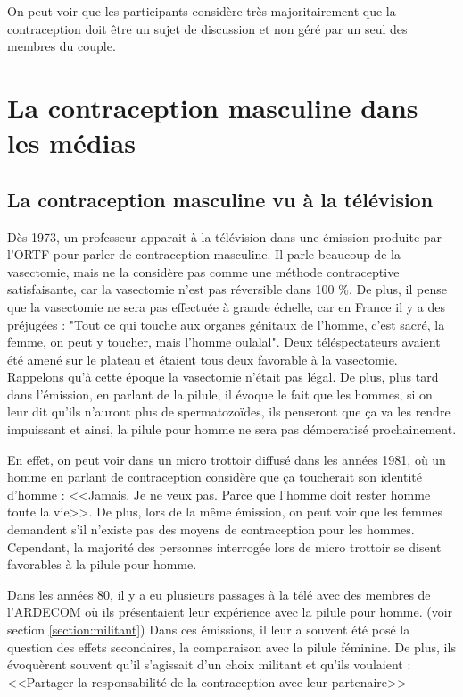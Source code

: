 \documentclass[12pt,a4paper]{report}
\begin{document}
On peut voir que les participants considère très majoritairement que la contraception doit être un sujet de discussion et non géré par un seul des membres du couple.

\section{La contraception masculine dans les médias}

\subsection{La contraception masculine vu à la télévision}

Dès 1973, un professeur apparait à la télévision dans une émission produite par l'ORTF pour parler de contraception masculine. Il parle beaucoup de la vasectomie, mais ne la considère pas comme une méthode contraceptive satisfaisante, car la vasectomie n'est pas réversible dans 100 \%. De plus, il pense que la vasectomie ne sera pas effectuée à grande échelle, car en France il y a des préjugées : "Tout ce qui touche aux organes génitaux de l'homme, c'est sacré, la femme, on peut y toucher, mais l'homme oulalal". Deux téléspectateurs avaient été amené sur le plateau et étaient tous deux favorable à la vasectomie. \cite{ProfesseurNetterContraception} Rappelons qu'à cette époque la vasectomie n'était pas légal. \cite{guillaumedaudinContraceptesEnqueteDernier2022} De plus, plus tard dans l'émission, en parlant de la pilule, il évoque le fait que les hommes, si on leur dit qu'ils n'auront plus de spermatozoïdes, ils penseront que ça va les rendre impuissant et ainsi, la pilule pour homme ne sera pas démocratisé prochainement. \cite{inaactuPilulePourHomme2019}

En effet, on peut voir dans un micro trottoir diffusé dans les années 1981, où un homme en parlant de contraception considère que ça toucherait son identité d'homme : <<Jamais. Je ne veux pas. Parce que l'homme doit rester homme toute la vie>>. De plus, lors de la même émission, on peut voir que les femmes demandent s'il n'existe pas des moyens de contraception pour les hommes. Cependant, la majorité des personnes interrogée lors de micro trottoir se disent favorables à la pilule pour homme. \cites{MicrotrottoirHommesPour}{PilulePourHomme}

Dans les années 80, il y a eu plusieurs passages à la télé avec des membres de l'ARDECOM où ils présentaient leur expérience avec la pilule pour homme. (voir section \ref{section:militant}) Dans ces émissions, il leur a souvent été posé la question des effets secondaires, la comparaison avec la pilule féminine. De plus, ils évoquèrent souvent qu'il s'agissait d'un choix militant et qu'ils voulaient : <<Partager la responsabilité de la contraception avec leur partenaire>> \cites{inaactuPilulePourHomme2019}{1980HommeVient}
\end{document}
